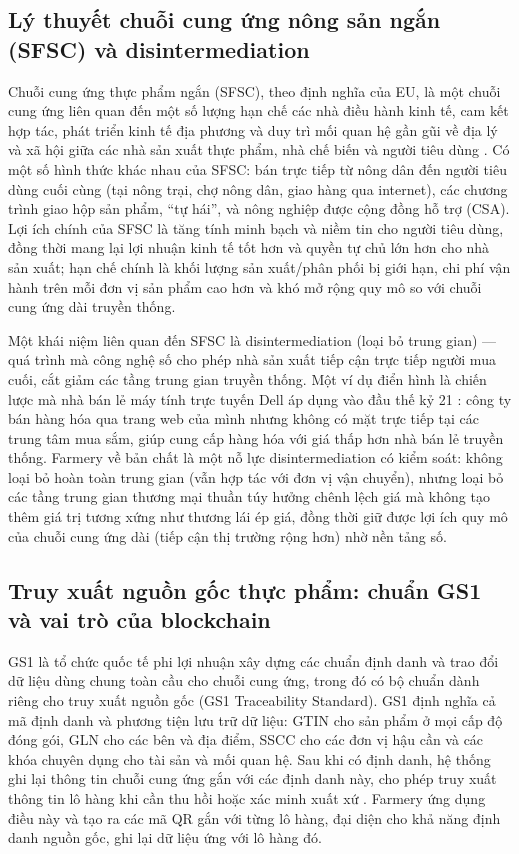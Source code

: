 \subsection{Lý thuyết chuỗi cung ứng nông sản ngắn (SFSC) và disintermediation}

Chuỗi cung ứng thực phẩm ngắn (SFSC), theo định nghĩa của EU, là một chuỗi cung ứng liên quan đến một số lượng hạn chế các nhà điều hành kinh tế, cam kết hợp tác, phát triển kinh tế địa phương và duy trì mối quan hệ gần gũi về địa lý và xã hội giữa các nhà sản xuất thực phẩm, nhà chế biến và người tiêu dùng \cite{tapchicongsan2018}. Có một số hình thức khác nhau của SFSC: bán trực tiếp từ nông dân đến người tiêu dùng cuối cùng (tại nông trại, chợ nông dân, giao hàng qua internet), các chương trình giao hộp sản phẩm, ``tự hái'', và nông nghiệp được cộng đồng hỗ trợ (CSA). Lợi ích chính của SFSC là tăng tính minh bạch và niềm tin cho người tiêu dùng, đồng thời mang lại lợi nhuận kinh tế tốt hơn và quyền tự chủ lớn hơn cho nhà sản xuất; hạn chế chính là khối lượng sản xuất/phân phối bị giới hạn, chi phí vận hành trên mỗi đơn vị sản phẩm cao hơn và khó mở rộng quy mô so với chuỗi cung ứng dài truyền thống.

Một khái niệm liên quan đến SFSC là disintermediation (loại bỏ trung gian) --- quá trình mà công nghệ số cho phép nhà sản xuất tiếp cận trực tiếp người mua cuối, cắt giảm các tầng trung gian truyền thống. Một ví dụ điển hình là chiến lược mà nhà bán lẻ máy tính trực tuyến Dell áp dụng vào đầu thế kỷ 21 \cite{britannica_disintermediation}: công ty bán hàng hóa qua trang web của mình nhưng không có mặt trực tiếp tại các trung tâm mua sắm, giúp cung cấp hàng hóa với giá thấp hơn nhà bán lẻ truyền thống. Farmery về bản chất là một nỗ lực disintermediation có kiểm soát: không loại bỏ hoàn toàn trung gian (vẫn hợp tác với đơn vị vận chuyển), nhưng loại bỏ các tầng trung gian thương mại thuần túy hưởng chênh lệch giá mà không tạo thêm giá trị tương xứng như thương lái ép giá, đồng thời giữ được lợi ích quy mô của chuỗi cung ứng dài (tiếp cận thị trường rộng hơn) nhờ nền tảng số.

\subsection{Truy xuất nguồn gốc thực phẩm: chuẩn GS1 và vai trò của blockchain}
\label{subsec:gs1blockchain}

GS1 là tổ chức quốc tế phi lợi nhuận xây dựng các chuẩn định danh và trao đổi dữ liệu dùng chung toàn cầu cho chuỗi cung ứng, trong đó có bộ chuẩn dành riêng cho truy xuất nguồn gốc (GS1 Traceability Standard). GS1 định nghĩa cả mã định danh và phương tiện lưu trữ dữ liệu: GTIN cho sản phẩm ở mọi cấp độ đóng gói, GLN cho các bên và địa điểm, SSCC cho các đơn vị hậu cần và các khóa chuyên dụng cho tài sản và mối quan hệ. Sau khi có định danh, hệ thống ghi lại thông tin chuỗi cung ứng gắn với các định danh này, cho phép truy xuất thông tin lô hàng khi cần thu hồi hoặc xác minh xuất xứ \cite{gs1_keys}. Farmery ứng dụng điều này và tạo ra các mã QR gắn với từng lô hàng, đại diện cho khả năng định danh nguồn gốc, ghi lại dữ liệu ứng với lô hàng đó.

